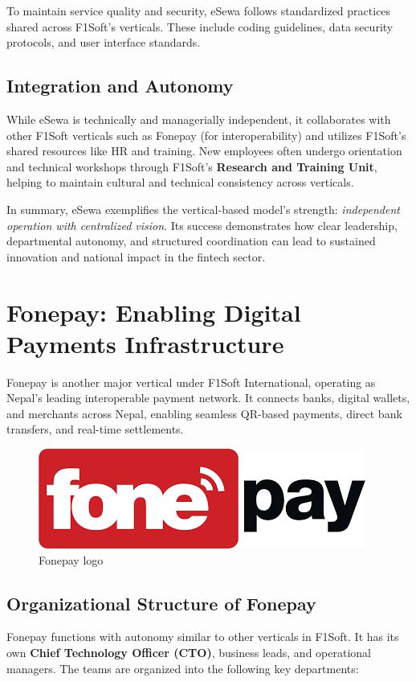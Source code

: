 \documentclass[12pt, a4paper]{report}
\begin{document}
To maintain service quality and security, eSewa follows standardized practices shared across F1Soft’s verticals. These include coding guidelines, data security protocols, and user interface standards.
\vspace{18pt}
\subsection{Integration and Autonomy}
While eSewa is technically and managerially independent, it collaborates with other F1Soft verticals such as Fonepay (for interoperability) and utilizes F1Soft’s shared resources like HR and training. New employees often undergo orientation and technical workshops through F1Soft’s \textbf{Research and Training Unit}, helping to maintain cultural and technical consistency across verticals.

\bigskip

In summary, eSewa exemplifies the vertical-based model’s strength: \textit{independent operation with centralized vision}. Its success demonstrates how clear leadership, departmental autonomy, and structured coordination can lead to sustained innovation and national impact in the fintech sector.
\newpage
\section{Fonepay: Enabling Digital Payments Infrastructure}
Fonepay is another major vertical under F1Soft International, operating as Nepal’s leading interoperable payment network. It connects banks, digital wallets, and merchants across Nepal, enabling seamless QR-based payments, direct bank transfers, and real-time settlements.
\begin{figure}[h]
\centering
\includegraphics[scale=0.5]{images/fonepay.png}
\caption{Fonepay logo}
\end{figure}


\subsection{Organizational Structure of Fonepay}
Fonepay functions with autonomy similar to other verticals in F1Soft. It has its own \textbf{Chief Technology Officer (CTO)}, business leads, and operational managers. The teams are organized into the following key departments:
\end{document}
